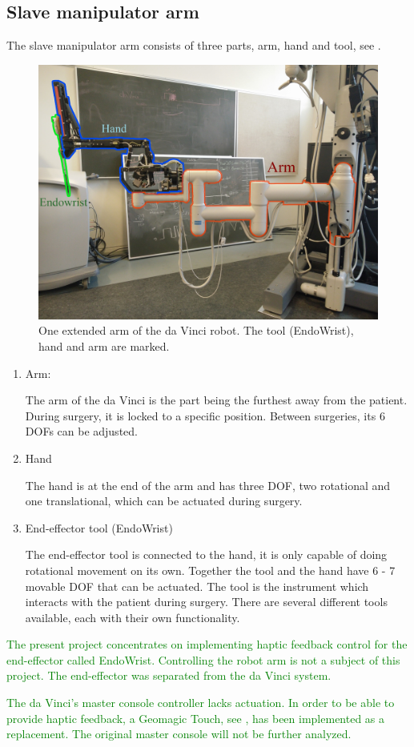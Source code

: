 

\subsection*{Slave manipulator arm}
The slave manipulator arm consists of three parts, arm, hand and tool, see .

\begin{figure}[H]
	\centering
		\centering
		\includegraphics[width=0.85\linewidth]{davincirobotarm_label.jpg}
		\caption{One extended arm of the da Vinci robot. The tool (EndoWrist), hand and arm are marked.}
		\label{fig:davinciarmrobot}
\end{figure}


\begin{enumerate}
\item Arm:

The arm of the da Vinci is the part being the furthest away from the patient. 
During surgery, it is locked to a specific position. Between surgeries, its 6 \gls{DOF}s can be adjusted.
\item Hand

The hand is at the end of the arm and has three \gls{DOF}, two rotational and one translational, which can be actuated during surgery. 
\item End-effector tool (EndoWrist)

The end-effector tool is connected to the hand, it is only capable of doing rotational movement on its own. Together the tool and the hand have 6 - 7 movable \gls{DOF} that can be actuated. The tool is the instrument which interacts with the patient during surgery. There are several different tools available, each with their own functionality. 
\end{enumerate}

\textcolor{green}{The present project concentrates on implementing haptic feedback control for the end-effector called EndoWrist. Controlling the robot arm is not a subject of this project. The end-effector was separated from the da Vinci system. 
	
The da Vinci's master console controller lacks actuation. In order to be able to provide haptic feedback, a Geomagic Touch, see , has been implemented as a replacement. The original master console will not be further analyzed. 	
}